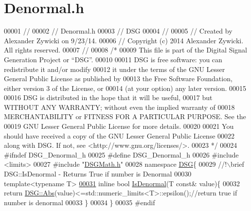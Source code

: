 \hypertarget{_denormal_8h_source}{\section{Denormal.\+h}
\label{_denormal_8h_source}
}

\begin{DoxyCode}
00001 \textcolor{comment}{//}
00002 \textcolor{comment}{//  Denormal.h}
00003 \textcolor{comment}{//  DSG}
00004 \textcolor{comment}{//}
00005 \textcolor{comment}{//  Created by Alexander Zywicki on 9/23/14.}
00006 \textcolor{comment}{//  Copyright (c) 2014 Alexander Zywicki. All rights reserved.}
00007 \textcolor{comment}{//}
00008 \textcolor{comment}{/*}
00009 \textcolor{comment}{ This file is part of the Digital Signal Generation Project or “DSG”.}
00010 \textcolor{comment}{}
00011 \textcolor{comment}{ DSG is free software: you can redistribute it and/or modify}
00012 \textcolor{comment}{ it under the terms of the GNU Lesser General Public License as published by}
00013 \textcolor{comment}{ the Free Software Foundation, either version 3 of the License, or}
00014 \textcolor{comment}{ (at your option) any later version.}
00015 \textcolor{comment}{}
00016 \textcolor{comment}{ DSG is distributed in the hope that it will be useful,}
00017 \textcolor{comment}{ but WITHOUT ANY WARRANTY; without even the implied warranty of}
00018 \textcolor{comment}{ MERCHANTABILITY or FITNESS FOR A PARTICULAR PURPOSE.  See the}
00019 \textcolor{comment}{ GNU Lesser General Public License for more details.}
00020 \textcolor{comment}{}
00021 \textcolor{comment}{ You should have received a copy of the GNU Lesser General Public License}
00022 \textcolor{comment}{ along with DSG.  If not, see <http://www.gnu.org/licenses/>.}
00023 \textcolor{comment}{ */}
00024 \textcolor{preprocessor}{#ifndef DSG\_Denormal\_h}
00025 \textcolor{preprocessor}{#define DSG\_Denormal\_h}
00026 \textcolor{preprocessor}{#include <limits>}
00027 \textcolor{preprocessor}{#include "\hyperlink{_d_s_g_math_8h}{DSGMath.h}"}
00028 \textcolor{keyword}{namespace }\hyperlink{namespace_d_s_g}{DSG}\{\textcolor{comment}{}
00029 \textcolor{comment}{    //!\(\backslash\)brief DSG::IsDenormal - Returns True if number is Denormal }
00030 \textcolor{comment}{}    \textcolor{keyword}{template}<\textcolor{keyword}{typename} T>
\hypertarget{_denormal_8h_source_l00031}{}\hyperlink{namespace_d_s_g_a9eee3c39a1f45d42f0b4fa7201d3ba3d}{00031}     \textcolor{keyword}{inline} \textcolor{keywordtype}{bool} \hyperlink{namespace_d_s_g_a9eee3c39a1f45d42f0b4fa7201d3ba3d}{IsDenormal}(T \textcolor{keyword}{const}& value)\{
00032         \textcolor{keywordflow}{return} \hyperlink{namespace_d_s_g_a0af03bade7e25e8da80e3022af0e45a7}{DSG::Abs}(value)<=std::numeric\_limits<T>::epsilon();\textcolor{comment}{//return true if number is
       denormal}
00033     \}
00034 \}
00035 \textcolor{preprocessor}{#endif}
\end{DoxyCode}
